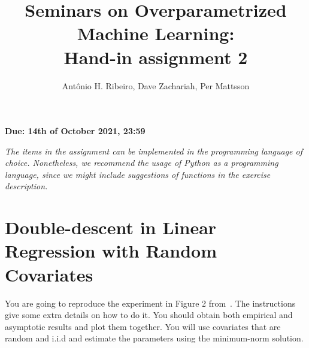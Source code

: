 \documentclass[a4paper,10pt]{article}
\title{Seminars on Overparametrized Machine Learning: \\Hand-in assignment 2}
\author{Antônio H. Ribeiro, Dave Zachariah, Per Mattsson}
\date{}
\newcounter{exercise}
\begin{document}
\maketitle
\vspace{6pt}
\begin{center}
	\large \textbf{Due: 14th  of October 2021, 23:59}
\end{center}

\textit{
The items in the assignment can be implemented in the programming language of choice.
Nonetheless, we recommend the usage of Python as a programming language, since we might include suggestions of functions in the exercise description.}



\section*{Double-descent in Linear Regression with Random Covariates}


You are going to reproduce the experiment in Figure 2 from~\citep{hastie_surprises_2019}. The instructions give some extra details on how to do it. You should obtain both empirical and asymptotic results and plot them together. You will use covariates that are random and i.i.d and estimate the parameters using the minimum-norm solution.
\end{document}
